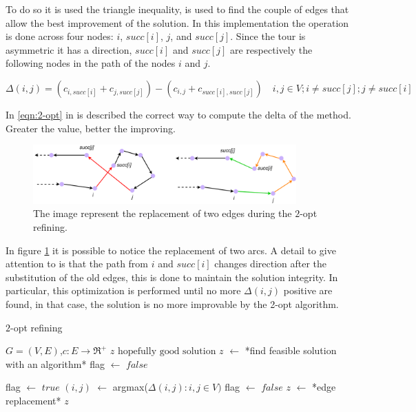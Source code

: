 To do so it is used the triangle inequality, is used to find the couple of edges that allow the best improvement of the solution. In this implementation the operation is done across four nodes: $i$, $succ[i]$, $j$, and $succ[j]$. Since the tour is asymmetric it has a direction, $succ[i]$ and $succ[j]$ are respectively the following nodes in the path of the nodes $i$ and $j$. 

\begin{equation}
	\label{eqn:2-opt}
	\Delta (i, j) = (c_{i, succ[i]} + c_{j, succ[j]}) - (c_{i, j} + c_{succ[i], succ[j]}) \quad i, j \in V; i\not=succ[j]; j\not=succ[i]
\end{equation}

In \ref{eqn:2-opt} in is described the correct way to compute the delta of the method. Greater the value, better the improving.

\begin{figure}[h]
	\centering
	\includegraphics[width=0.9\textwidth]{images/2_opt_new.png}
	\caption{The image represent the replacement of two edges during the $2$-opt refining.}
	\label{fig:2-opt}
\end{figure}

In figure \ref{fig:2-opt} it is possible to notice the replacement of two arcs. A detail to give attention to is that the path from $i$ and $succ[i]$ changes direction after the substitution of the old edges, this is done to maintain the solution integrity. In particular, this optimization is performed until no more $\Delta(i, j)$ positive are found, in that case, the solution is no more improvable by the 2-opt algorithm.

\begin{algorithm}
	\caption{$2$-opt refining}\label{algo:2-opt}
	\begin{algorithmic}[1]
		\Require $G=(V,E)$,$ c:E\rightarrow \Re^+$
		\Ensure $z\text{ hopefully good solution}$
		\State $z$ $\gets$ *find feasible solution with an algorithm*
		\State flag $\gets$ $false$
		
			\State flag $\gets$ $true$
			\State $(i, j)$ $\gets$ argmax($\Delta(i, j):i, j\in V)$
				\State flag $\gets$ $false$
				\State $z$ $\gets$ *edge replacement*
			\EndIf
		\EndWhile
		\State \Return $z$
	\end{algorithmic}
\end{algorithm}

